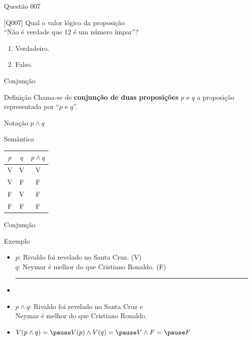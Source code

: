 \documentclass[xcolor=dvipsnames,table]{beamer}
\begin{document}
\begin{frame}{Questão 007}
\begin{block}{[Q007]}
	Qual o valor lógico da proposição \\
	``Não é verdade que 12 é um número ímpar''?
\end{block}
\begin{enumerate}[label=(\Alph*)]
	\item Verdadeiro.
	\item Falso.
\end{enumerate}
\end{frame}

\begin{frame}{Conjunção}
	\begin{block}{Definição}
		Chama-se de {\bf conjunção de duas proposições} $p$ e $q$ a proposição representada por ``$p$ e $q$''.
	\end{block} \pause
	\begin{block}{Notação}
		$p \wedge q$
	\end{block} \pause
	\begin{block}{Semântica}
		\begin{center}
			\begin{tabular}{|cc|c|}
				\hline
				$p$	&	$q$	&	$p \wedge q$	\\
				\hline
				V	&	V	&	V	\\
				V	&	F	&	F	\\
				F	&	V	&	F	\\
				F	&	F	&	F	\\
				\hline
			\end{tabular}
		\end{center}
	\end{block}
\end{frame}

\begin{frame}{Conjunção}
	\begin{block}{Exemplo}
		\begin{itemize}
			\item $p$: Rivaldo foi revelado no Santa Cruz. \hspace*{0.9cm} (V)\\
			$q$: Neymar é melhor do que Cristiano Ronaldo. \hspace*{0.9cm} (F)\\
			\hrule
			\item \pause
			\item $p \wedge q$: Rivaldo foi revelado no Santa Cruz e \\Neymar é melhor do que Cristiano Ronaldo.\\ \pause
			\item $V(p \wedge q) = \pause V(p) \wedge V(q) = \pause V \wedge F = \pause F$
		\end{itemize}
	\end{block}
\end{frame}
\end{document}
